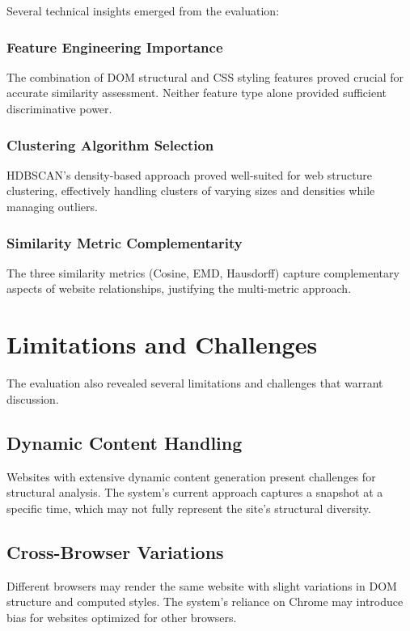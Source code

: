 Several technical insights emerged from the evaluation:

\subsubsection{Feature Engineering Importance}
The combination of DOM structural and CSS styling features proved crucial for accurate similarity assessment. Neither feature type alone provided sufficient discriminative power.

\subsubsection{Clustering Algorithm Selection}
HDBSCAN's density-based approach proved well-suited for web structure clustering, effectively handling clusters of varying sizes and densities while managing outliers.

\subsubsection{Similarity Metric Complementarity}
The three similarity metrics (Cosine, EMD, Hausdorff) capture complementary aspects of website relationships, justifying the multi-metric approach.

\section{Limitations and Challenges}
\label{sec:limitations-discussion}

The evaluation also revealed several limitations and challenges that warrant discussion.

\subsection{Dynamic Content Handling}
\label{subsec:dynamic-content}

Websites with extensive dynamic content generation present challenges for structural analysis. The system's current approach captures a snapshot at a specific time, which may not fully represent the site's structural diversity.

\subsection{Cross-Browser Variations}
\label{subsec:browser-variations}

Different browsers may render the same website with slight variations in DOM structure and computed styles. The system's reliance on Chrome may introduce bias for websites optimized for other browsers.


